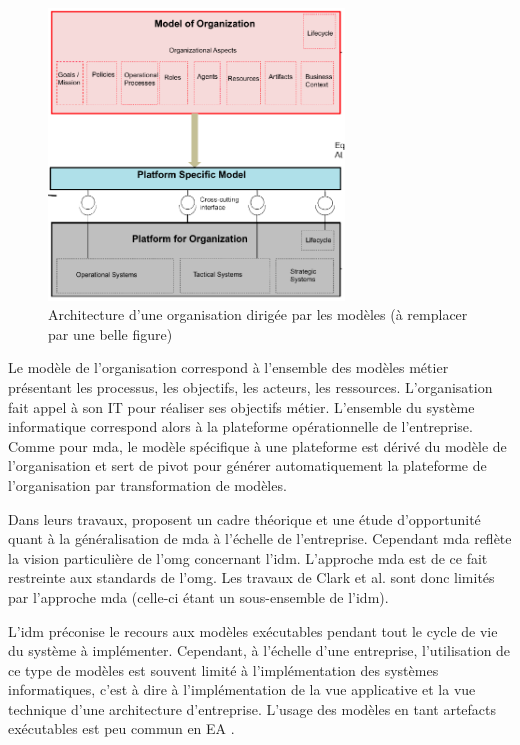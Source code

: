 \begin{figure}[!htbp]
 \begin{center}
   \includegraphics[width=0.7\textwidth]{figures/3_etat_de_l_art_IDM/mdo.png}
 \end{center}
 \caption{Architecture d'une organisation dirigée par les modèles (à remplacer par une belle figure) \protect\cite{clark_towards_2014}}
 \label{fig:mdo}
\end{figure}

Le modèle de l'organisation correspond à l'ensemble des modèles métier présentant les processus, les objectifs, les acteurs, les ressources. L'organisation fait appel à son IT pour réaliser ses objectifs métier. L'ensemble du système informatique correspond alors à la plateforme opérationnelle de l'entreprise. Comme pour \gls{mda}, le modèle spécifique à une plateforme est dérivé du modèle de l'organisation et sert de pivot pour générer automatiquement la plateforme de l'organisation par transformation de modèles.

Dans leurs travaux, \cite{clark_towards_2014} proposent un cadre théorique et une étude d'opportunité quant à la généralisation de \gls{mda} à l'échelle de l'entreprise. Cependant \gls{mda} reflète la vision particulière de l'\gls{omg} concernant l'\gls{idm}. L'approche \gls{mda} est de ce fait restreinte aux standards de l'\gls{omg}. Les travaux de Clark et al. sont donc limités par l'approche \gls{mda} (celle-ci étant un sous-ensemble de l'\gls{idm}).

L'\gls{idm} préconise le recours aux modèles exécutables pendant tout le cycle de vie du système à implémenter. Cependant, à l'échelle d'une entreprise, l'utilisation de ce type de modèles est souvent limité à l'implémentation des systèmes informatiques, c'est à dire à l'implémentation de la vue applicative et la vue technique d'une architecture d'entreprise. L'usage des modèles en tant artefacts exécutables est peu commun en EA \cite{kulkarni_modelling_2013}.

